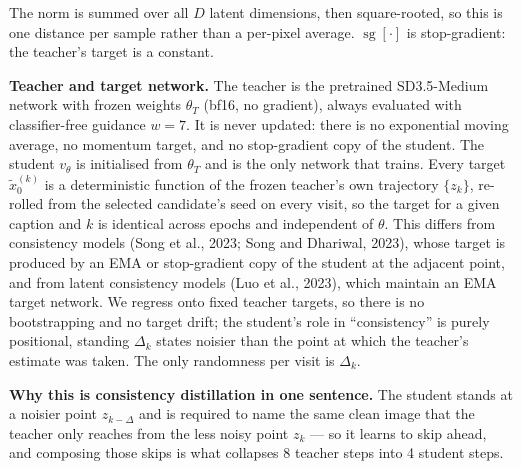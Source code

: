 \documentclass[11pt,a4paper]{article}
\DeclareMathOperator{\sg}{sg}
\begin{document}
The norm is summed over all $D$ latent dimensions, then square-rooted, so this is one distance per sample rather than a per-pixel average. $\sg[\cdot]$ is stop-gradient: the teacher's target is a constant.

\vspace{0.5em}
\noindent\textbf{Teacher and target network.} The teacher is the pretrained SD3.5-Medium network with frozen weights $\theta_T$ (bf16, no gradient), always evaluated with classifier-free guidance $w = 7$. It is never updated: there is no exponential moving average, no momentum target, and no stop-gradient copy of the student. The student $v_\theta$ is initialised from $\theta_T$ and is the only network that trains. Every target $\tilde{x}_0^{(k)}$ is a deterministic function of the frozen teacher's own trajectory $\{z_k\}$, re-rolled from the selected candidate's seed on every visit, so the target for a given caption and $k$ is identical across epochs and independent of $\theta$. This differs from consistency models (Song et al., 2023; Song and Dhariwal, 2023), whose target is produced by an EMA or stop-gradient copy of the student at the adjacent point, and from latent consistency models (Luo et al., 2023), which maintain an EMA target network. We regress onto fixed teacher targets, so there is no bootstrapping and no target drift; the student's role in ``consistency'' is purely positional, standing $\Delta_k$ states noisier than the point at which the teacher's estimate was taken. The only randomness per visit is $\Delta_k$.

\vspace{0.5em}
\noindent\textbf{Why this is consistency distillation in one sentence.} The student stands at a noisier point $z_{k-\Delta}$ and is required to name the same clean image that the teacher only reaches from the less noisy point $z_k$ --- so it learns to skip ahead, and composing those skips is what collapses 8 teacher steps into 4 student steps.
\end{document}
